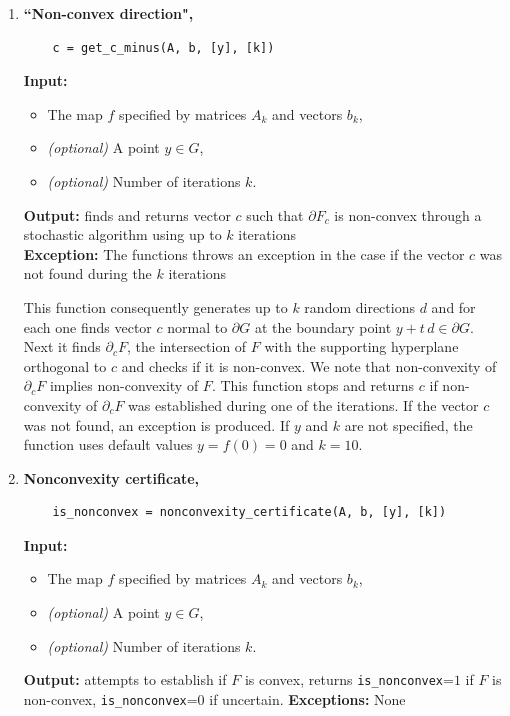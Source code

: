 \documentclass[a4paper]{article}
\theoremstyle{definition}
\begin{document}
\begin{enumerate}
\item {\bf ``Non-convex direction",\hskip 6pt} 
	\begin{verbatim}
	c = get_c_minus(A, b, [y], [k])
	\end{verbatim}
{\bf Input:}
\begin{itemize}
	\item The map $f$ specified by matrices $A_k$ and vectors $b_k$,
	\item {\it (optional)} A point $y\in G$,
	\item {\it (optional)} Number of iterations $k$.
\end{itemize}
{\bf Output:}  finds and returns vector $c$ such that $\partial F_c$ is non-convex through a stochastic algorithm using up to $k$ iterations\\
{\bf Exception:} The functions throws an exception in the case if the vector $c$ was not found during the $k$ iterations

This function consequently generates up to $k$ random directions $d$ and for each one finds vector $c$ normal to $\partial G$ at the boundary point $y+t\, d\in \partial G$.
Next it finds $\partial_c F$, the intersection of $F$ with the supporting hyperplane orthogonal to $c$ and checks if it is non-convex. 
We note that non-convexity of $\partial_c F$ implies non-convexity of $F$.
This function stops and returns $c$ if non-convexity of $\partial_c F$ was established during one of the iterations. If the vector $c$ was not found, an exception is produced.
If $y$ and $k$ are not specified, the function uses default values $y=f(0)=0$ and $k=10$.


\item {\bf Nonconvexity certificate,\hskip 6pt} 
	\begin{verbatim}
	is_nonconvex = nonconvexity_certificate(A, b, [y], [k])
	\end{verbatim}
{\bf Input:}
\begin{itemize}
	\item The map $f$ specified by matrices $A_k$ and vectors $b_k$,
	\item {\it (optional)} A point $y\in G$,
	\item {\it (optional)} Number of iterations $k$.
\end{itemize}
{\bf Output:} attempts to establish if $F$ is convex, returns {\tt is\_nonconvex}=$1$ if $F$ is non-convex,  {\tt is\_nonconvex}=$0$ if uncertain.
{\bf Exceptions:} None


\end{enumerate}
\end{document}
